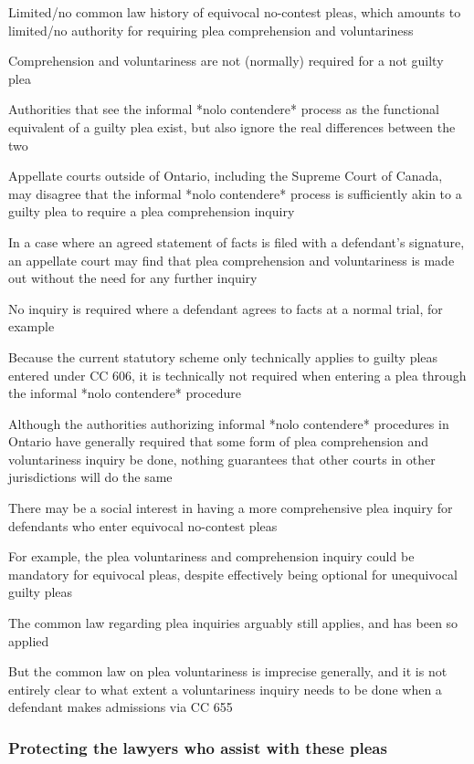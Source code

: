 Limited/no common law history of equivocal no-contest pleas, which amounts to limited/no authority for requiring plea comprehension and voluntariness

Comprehension and voluntariness are not (normally) required for a not guilty plea

Authorities that see the informal *nolo contendere* process as the functional equivalent of a guilty plea exist, but also ignore the real differences between the two

Appellate courts outside of Ontario, including the Supreme Court of Canada, may disagree that the informal *nolo contendere* process is sufficiently akin to a guilty plea to require a plea comprehension inquiry

In a case where an agreed statement of facts is filed with a defendant's signature, an appellate court may find that plea comprehension and voluntariness is made out without the need for any further inquiry

No inquiry is required where a defendant agrees to facts at a normal trial, for example

Because the current statutory scheme only technically applies to guilty pleas entered under CC 606, it is technically not required when entering a plea through the informal *nolo contendere* procedure

Although the authorities authorizing informal *nolo contendere* procedures in Ontario have generally required that some form of plea comprehension and voluntariness inquiry be done, nothing guarantees that other courts in other jurisdictions will do the same

There may be a social interest in having a more comprehensive plea inquiry for defendants who enter equivocal no-contest pleas

For example, the plea voluntariness and comprehension inquiry could be mandatory for equivocal pleas, despite effectively being optional for unequivocal guilty pleas

The common law regarding plea inquiries arguably still applies, and has been so applied

But the common law on plea voluntariness is imprecise generally, and it is not entirely clear to what extent a voluntariness inquiry needs to be done when a defendant makes admissions via CC 655
 
\subsubsection{Protecting the lawyers who assist with these pleas}

